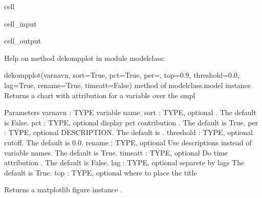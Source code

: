 \documentclass[letterpaper,10pt,english]{jupyterBook}
\begin{document}
\begin{sphinxuseclass}{cell}\begin{sphinxVerbatimInput}

\begin{sphinxuseclass}{cell_input}
\begin{sphinxVerbatim}[commandchars=\\\{\}]
\end{sphinxVerbatim}

\end{sphinxuseclass}\end{sphinxVerbatimInput}
\begin{sphinxVerbatimOutput}

\begin{sphinxuseclass}{cell_output}
\begin{sphinxVerbatim}[commandchars=\\\{\}]
Help on method dekomp\PYGZus{}plot in module modelclass:

dekomp\PYGZus{}plot(varnavn, sort=True, pct=True, per=\PYGZsq{}\PYGZsq{}, top=0.9, threshold=0.0, lag=True, rename=True, time\PYGZus{}att=False) method of modelclass.model instance
    Returns  a chart with attribution for a variable over the smpl  
    
    Parameters
    \PYGZhy{}\PYGZhy{}\PYGZhy{}\PYGZhy{}\PYGZhy{}\PYGZhy{}\PYGZhy{}\PYGZhy{}\PYGZhy{}\PYGZhy{}
    varnavn : TYPE
        variable name.
    sort : TYPE, optional
        . The default is False.
    pct : TYPE, optional
        display pct contribution . The default is True.
    per : TYPE, optional
        DESCRIPTION. The default is \PYGZsq{}\PYGZsq{}.
    threshold : TYPE, optional
        cutoff. The default is 0.0.
    rename : TYPE, optional
        Use descriptions instead of variable names. The default is True.
    time\PYGZus{}att : TYPE, optional
        Do time attribution . The default is False.
    lag : TYPE, optional
       separete by lags The default is True.           
    top : TYPE, optional
      where to place the title 
       
    
    Returns
    \PYGZhy{}\PYGZhy{}\PYGZhy{}\PYGZhy{}\PYGZhy{}\PYGZhy{}\PYGZhy{}
    a matplotlib figure instance .
\end{sphinxVerbatim}

\end{sphinxuseclass}\end{sphinxVerbatimOutput}

\end{sphinxuseclass}
\end{document}
